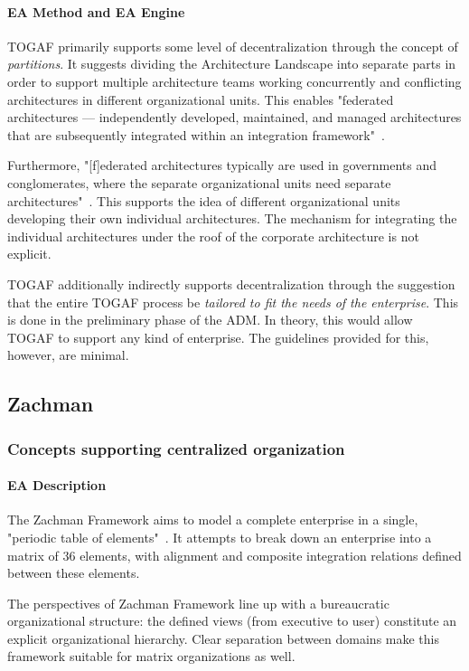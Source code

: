 \paragraph*{EA Method and EA Engine}
TOGAF primarily supports some level of decentralization through the concept of \textit{partitions}. It suggests dividing the Architecture Landscape into separate parts in order to support multiple architecture teams working concurrently and conflicting architectures in different organizational units. This enables "federated architectures — independently developed, maintained, and managed architectures that are subsequently integrated within an integration framework"~\cite[Ch. 40.3]{togaf9.1}. 

Furthermore, "[f]ederated architectures typically are used in governments and conglomerates, where the separate organizational units need separate architectures"~\cite[Ch. 40.3]{togaf9.1}. This supports the idea of different organizational units developing their own individual architectures. The mechanism for integrating the individual architectures under the roof of the corporate architecture is not explicit. 


TOGAF additionally indirectly supports decentralization through the suggestion that the entire TOGAF process be\textit{ tailored to fit the needs of the enterprise}. This is done in the preliminary phase of the ADM. In theory, this would allow TOGAF to support any kind of enterprise. The guidelines provided for this, however, are minimal. 

\subsection{Zachman}
\subsubsection{Concepts supporting centralized organization}

\paragraph*{EA Description}
The Zachman Framework aims to model a complete enterprise in a single, "periodic table of elements"~\cite{Bente2012}. It attempts to break down an enterprise into a matrix of 36 elements, with alignment and composite integration relations defined between these elements. 

The perspectives of Zachman Framework line up with a bureaucratic organizational structure: the defined views (from executive to user) constitute an explicit organizational hierarchy. Clear separation between domains make this framework suitable for matrix organizations as well. 

